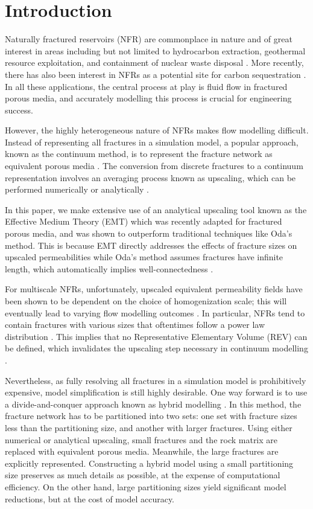 \documentclass[a4paper]{article}
\begin{document}
\section{Introduction}
Naturally fractured reservoirs (NFR) are commonplace in nature and of great interest in areas including but not limited to hydrocarbon extraction, geothermal resource exploitation, and containment of nuclear waste disposal \citep{Berkowitz2002}. More recently, there has also been 
interest in NFRs as a potential site for carbon sequestration \citep{March2018}. In all these applications, the central process at play is fluid flow in fractured porous media, and accurately modelling this process is crucial for engineering success.

However, the highly heterogeneous nature of NFRs makes flow modelling difficult. Instead of representing all fractures in a simulation model, a popular approach, known as the continuum method, is to represent the fracture network as equivalent porous media \citep{Ezulike2013, Lemonnier2010a, Lemonnier2010, Warren1963, Yan2016}. The conversion from discrete fractures to a continuum representation involves an averaging process known as upscaling, which can be performed numerically or analytically \citep{Durlofsky1991,Oda1985,Renard1997,Saevik2013}. 

In this paper, we make extensive use of an analytical upscaling tool known as the Effective Medium Theory (EMT) which was recently adapted for fractured porous media, and was shown to outperform traditional techniques like Oda's method. This is because EMT directly addresses the effects of fracture sizes on upscaled permeabilities while Oda's method assumes fractures have infinite length, which automatically implies well-connectedness \citep{Oda1985, Saevik2013, Saevik2014}.

For multiscale NFRs, unfortunately, upscaled equivalent permeability fields have been shown to be dependent on the choice of homogenization scale; this will eventually lead to varying flow modelling outcomes \citep{Elfeel2013}. In particular, NFRs tend to contain fractures with various sizes that oftentimes follow a power law distribution \citep{Bonnet2001}. This implies that no Representative Elementary Volume (REV) can be defined, which invalidates the upscaling step necessary in continuum modelling \citep{Berkowitz2002}.

Nevertheless, as fully resolving all fractures in a simulation model is prohibitively expensive, model simplification is still highly desirable. One way forward is to use a divide-and-conquer approach known as hybrid modelling \citep{Berkowitz2002, Bourbiaux2010}. In this method, the fracture network has to be partitioned into two sets: one set with fracture sizes less than the partitioning size, and another with larger fractures. Using either numerical or analytical upscaling, small fractures and the rock matrix are replaced with equivalent porous media. Meanwhile, the large fractures are explicitly represented. Constructing a hybrid model using a small partitioning size preserves as much details as possible, at the expense of computational efficiency. On the other hand, large partitioning sizes yield significant model reductions, but at the cost of model accuracy.
\end{document}
